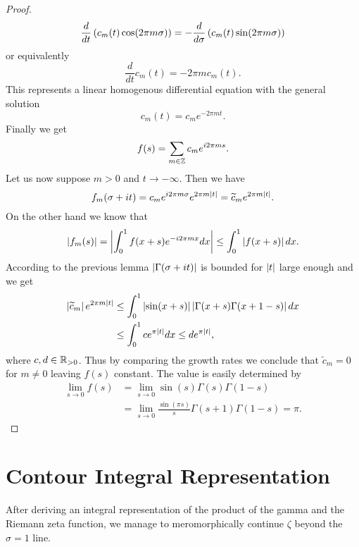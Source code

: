 \begin{proof}
\begin{equation*}
	\frac{d}{dt}\left(c_m(t) \cos(2 \pi m \sigma)\right) = - \frac{d}{d\sigma}\left(c_m(t) \sin(2 \pi m \sigma)\right)
\end{equation*}
	or equivalently
\begin{equation*}
	\frac{d}{dt} c_m(t) = -2 \pi m c_m(t).
\end{equation*}
	This represents a linear homogenous differential equation with the general solution
\begin{equation*}
	c_m(t) = c_m e^{-2 \pi m t}.
\end{equation*}
	Finally we get
\begin{equation*}
	f(s) = \sum _{m \in \mathbb{Z}} c_m e^{i 2 \pi m s}.
\end{equation*}
	Let us now suppose $m > 0$ and $t \to -\infty$. Then we have
\begin{equation*}
	f_m(\sigma + i t) = c_m e^{i 2 \pi m \sigma} e^{2 \pi m \left|t\right|} = \widetilde{c}_m e^{2 \pi m \left|t\right|}.
\end{equation*}
	On the other hand we know that
\begin{equation*}
	\left|f_m(s)\right| = \left|\int _0 ^1 f(x + s) e^{- i 2 \pi m x} dx\right| \leq \int _0 ^1 \left|f(x + s)\right| dx.
\end{equation*}
	According to the previous lemma  $\left|\Gamma(\sigma + i t)\right|$ is bounded for $\left|t\right|$ large enough and we get
\begin{equation*}
\begin{aligned}
	\left|\widetilde{c}_m\right| e^{2 \pi m \left|t\right|}
	&\leq \int_0^1 \left|\sin(x + s)\right| \left|\Gamma(x + s) \Gamma(x + 1 - s)\right| dx \\
	&\leq \int_0^1 c e^{\pi \left|t\right|} dx
	\leq d e^{\pi \left|t\right|},
\end{aligned}
\end{equation*}
	where $c,d \in \mathbb{R}_{> 0}$. Thus by comparing the growth rates we conclude that $\widetilde{c}_m = 0$ for $m \neq 0$ leaving $f(s)$ constant. The value is easily determined by
\begin{equation*}
\begin{aligned}
	\lim\limits_{s \to 0} f(s)
	&= \lim\limits_{s \to 0} \sin(s) \Gamma(s) \Gamma(1 - s) \\
	&= \lim\limits_{s \to 0} \frac{\sin(\pi s)}{s} \Gamma(s + 1) \Gamma(1 - s)
	= \pi.
\end{aligned}	
\end{equation*}
\end{proof}


\section{Contour Integral Representation}
After deriving an integral representation of the product of the gamma and the Riemann zeta function, we manage to meromorphically continue $\zeta$ beyond the $\sigma = 1$ line.


